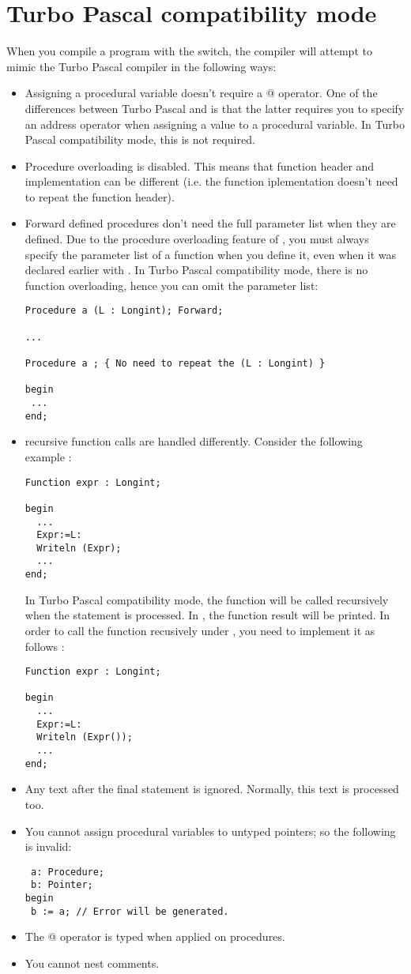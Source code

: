 \documentclass{report}
\begin{document}
\section{Turbo Pascal compatibility mode}
When you compile a program with the  switch, the compiler will
attempt to mimic the Turbo Pascal compiler in the following ways:
\begin{itemize}
\item Assigning a procedural variable doesn't require a @ operator. One of
the differences between Turbo Pascal and \fpc is that the latter requires
you to specify an address operator when assigning a value to a procedural
variable. In Turbo Pascal compatibility mode, this is not required.
\item Procedure overloading is disabled. This means that function header and
implementation can be different (i.e. the function iplementation doesn't
need to repeat the function header).
\item Forward defined procedures don't need the full parameter list when
they are defined. Due to the procedure overloading feature of \fpc, you must
always specify the parameter list of a function when you define it, even
when it was declared earlier with . In Turbo Pascal
compatibility mode, there is no function overloading, hence you can omit the
parameter list:
\begin{verbatim}
Procedure a (L : Longint); Forward;

...

Procedure a ; { No need to repeat the (L : Longint) }

begin
 ...
end;

\end{verbatim}
\item recursive function calls are handled differently. Consider the
following example :
\begin{verbatim}
Function expr : Longint;

begin
  ...
  Expr:=L:
  Writeln (Expr);
  ...
end;
\end{verbatim}
In Turbo Pascal compatibility mode, the function will be called recursively
when the  statement is processed. In \fpc, the function result
will be printed. In order to call the function recusively under \fpc, you
need to implement it as follows :
\begin{verbatim}
Function expr : Longint;

begin
  ...
  Expr:=L:
  Writeln (Expr());
  ...
end;
\end{verbatim}
\item Any text after the final  statement is ignored. Normally,
this text is processed too.
\item You cannot assign procedural variables to untyped pointers; so the
following is invalid:
\begin{verbatim}
 a: Procedure;
 b: Pointer;
begin
 b := a; // Error will be generated.
\end{verbatim}
\item The @ operator is typed when applied on procedures.
\item You cannot nest comments.
\end{itemize}
\end{document}
